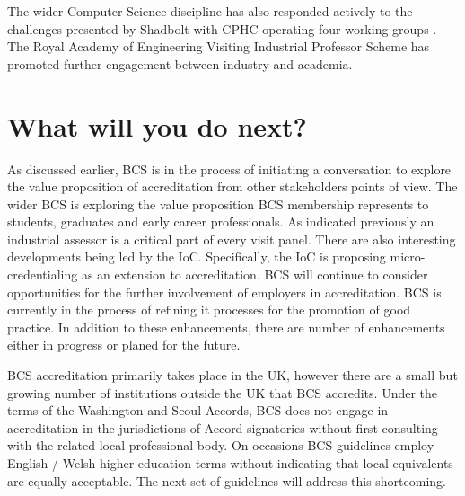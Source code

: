 \documentclass[sigconf]{acmart}
\begin{document}
The wider Computer Science discipline has also responded actively to the challenges presented by Shadbolt with CPHC operating four working groups \cite{cphc_2016}.  The Royal Academy of Engineering Visiting Industrial Professor Scheme \cite{royal} has promoted further engagement between industry and academia.

\section {What will you do next?}	
As discussed earlier,  BCS is in the process of initiating a conversation to explore the value proposition of accreditation from other stakeholders points of view. The wider BCS is exploring the value proposition BCS membership represents to students, graduates and early career professionals. As indicated previously an industrial assessor is a critical part of every visit panel. There are also interesting developments being led by the IoC. Specifically, the IoC is proposing micro-credentialing as an extension to accreditation. BCS will continue to consider opportunities for the further involvement of employers in accreditation. BCS is currently in the process of refining it processes for the promotion of good practice. In addition to these enhancements, there are number of enhancements  either in progress or planed for the future.

BCS accreditation primarily takes place in the UK, however there are a small but growing number of institutions outside the UK that BCS accredits. Under the terms of the Washington and Seoul Accords, BCS does not engage in accreditation in the jurisdictions of Accord signatories without first consulting with the related local professional body.  On occasions BCS guidelines employ English / Welsh higher education terms without indicating that local equivalents are equally acceptable. The next set of guidelines will address this shortcoming.
\end{document}
